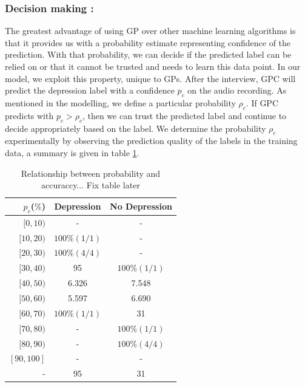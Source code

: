 \documentclass{article}
\begin{document}
	\subsubsection{Decision making :}
	The greatest advantage of using GP over other machine learning algorithms is that it provides us with a probability estimate representing confidence of the prediction. 
	With that probability, we can decide if the predicted label can be relied on or that it cannot be trusted and needs to learn this data point. In our model, we exploit this property, unique to GPs. 
	After the interview, GPC will predict the depression label with a confidence $p_c$ on the audio recording. 
	As mentioned in the modelling, we define a particular probability $\rho_c$. If GPC predicts with $p_c>\rho_c$, then we can trust the predicted label and continue to decide appropriately based on the label. 
	We determine the probability $\rho_c$ experimentally by observing the prediction quality of the labels in the training data, a summary is given in table \ref{tab:rho}.
	
 	\begin{table}[h]
 		\begin{center}
  			\begin{tabular}{ | r | c | c | }
    			\hline
			 	 \bfseries $p_c$($\%$)	& \bfseries Depression 	& \bfseries No Depression \\ \hline
				 $[0,10)$		& - 			& - 			 \\ \hline
				 $[10,20)$		& $100\%(1/1)$ 		& -		 \\ \hline
				 $[20,30)$		& $100\%(4/4)$ 		& - 	 \\ \hline
				 $[30,40)$		& 95 			& $100\%(1/1)$ 			 \\ \hline
				 $[40,50)$		& 6.326 		& 7.548		 \\ \hline
				 $[50,60)$		& 5.597 		& 6.690 	 \\ \hline 
				 $[60,70)$		& $100\%(1/1)$ 			& 31 			 \\ \hline
				 $[70,80)$		& - 		& $100\%(1/1)$		 \\ \hline
				 $[80,90)$		& - 		& $100\%(4/4)$ 	 \\ \hline 
				 $[90,100]$		& - 			& - 			 \\ \hline
				 -		& 95 			& 31 			 \\ \hline
			 \end{tabular}
		\end{center}
 	\caption{Relationship between probability and accuraccy... Fix table later}
 	\label{tab:rho}
 	\end{table}
\end{document}
